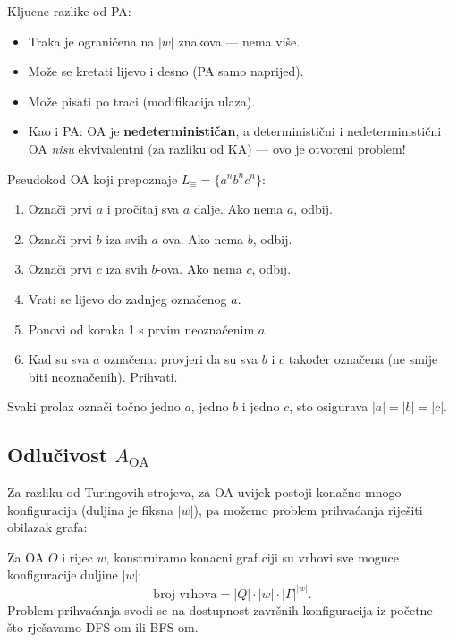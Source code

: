 \begin{napomena}
Kljucne razlike od PA:
\begin{itemize}
    \item Traka je ograničena na $|w|$ znakova --- nema više.
    \item Može se kretati lijevo i desno (PA samo naprijed).
    \item Može pisati po traci (modifikacija ulaza).
    \item Kao i PA: OA je \textbf{nedeterminističan}, a
      deterministični i nedeterministični OA \emph{nisu} ekvivalentni
      (za razliku od KA) --- ovo je otvoreni problem!
\end{itemize}
\end{napomena}

\begin{primjer}[OA za $L_\equiv$]
Pseudokod OA koji prepoznaje $L_\equiv = \{a^n b^n c^n\}$:
\begin{enumerate}
    \item Označi prvi $a$ i pročitaj sva $a$ dalje. Ako nema $a$, odbij.
    \item Označi prvi $b$ iza svih $a$-ova. Ako nema $b$, odbij.
    \item Označi prvi $c$ iza svih $b$-ova. Ako nema $c$, odbij.
    \item Vrati se lijevo do zadnjeg označenog $a$.
    \item Ponovi od koraka 1 s prvim neoznačenim $a$.
    \item Kad su sva $a$ označena: provjeri da su sva $b$ i $c$
      također označena (ne smije biti neoznačenih). Prihvati.
\end{enumerate}
Svaki prolaz označi točno jedno $a$, jedno $b$ i jedno $c$,
sto osigurava $|a| = |b| = |c|$.
\end{primjer}

\subsection{Odlučivost $A_\text{OA}$}

Za razliku od Turingovih strojeva, za OA uvijek postoji konačno
mnogo konfiguracija (duljina je fiksna $|w|$), pa možemo problem
prihvaćanja riješiti obilazak grafa:

Za OA $O$ i rijec $w$, konstruiramo konacni graf ciji su vrhovi
sve moguce konfiguracije duljine $|w|$:
\[
  \text{broj vrhova} = |Q| \cdot |w| \cdot |\Gamma|^{|w|}.
\]
Problem prihvaćanja svodi se na dostupnost završnih konfiguracija
iz početne --- što rješavamo DFS-om ili BFS-om.

